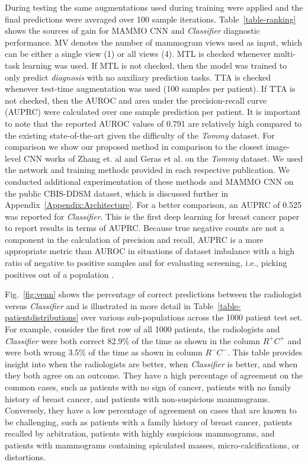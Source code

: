 \documentclass[journal]{IEEEtran}
\begin{document}
During testing the same augmentations used during training were applied and the final predictions were averaged over 100 sample iterations.  Table~\ref{table-ranking} shows the sources of gain for MAMMO CNN and \textit{Classifier} diagnostic performance.  MV denotes the number of mammogram views used as input, which can be either a single view (1) or all views (4).  MTL is checked whenever multi-task learning was used.  If MTL is not checked, then the model was trained to only predict \textit{diagnosis} with no auxiliary prediction tasks.  TTA is checked whenever test-time augmentation was used (100 samples per patient). If TTA is not checked, then the AUROC and area under the precision-recall curve (AUPRC) were calculated over one sample prediction per patient. It is important to note that the reported AUROC values of 0.791 are relatively high compared to the existing state-of-the-art given the difficulty of the \textit{Tommy} dataset. For comparison we show our proposed method in comparison to the closest image-level CNN works of Zhang et. al \cite{fullimage-zhang} and Geras et al. \cite{krysztof-etal-2017} on the \textit{Tommy} dataset. We used the network and training methods provided in each respective publication.  We conducted additional experimentation of these methods and MAMMO CNN on the public CBIS-DDSM dataset, which is discussed further in Appendix~\ref{Appendix:Architecture}. For a better comparison, an AUPRC of 0.525 was reported for  \textit{Classifier}.  This is the first deep learning for breast cancer paper to report results in terms of AUPRC.  Because true negative counts are not a component in the calculation of precision and recall, AUPRC is a more appropriate metric than AUROC in situations of dataset imbalance with a high ratio of negative to positive samples and for evaluating screening, i.e., picking positives out of a population \cite{AUPRC-2015, AUPRC-2006}.
 
Fig.~\ref{fig:venn} shows the percentage of correct predictions between the radiologist versus \textit{Classifier} and is illustrated in more detail in Table~\ref{table-patientdistributions} over various sub-populations across the 1000 patient test set.  For example, consider the first row of all 1000 patients, the radiologists and \textit{Classifier} were both correct 82.9\% of the time as shown in the column $R^+C^+$ and were both wrong 3.5\% of the time as shown in column $R^-C^-$.
This table provides insight into when the radiologists are better, when \textit{Classifier} is better, and when they both agree on an outcome.  They have a high percentage of agreement on the common cases, such as patients with no sign of cancer, patients with no family history of breast cancer, and patients with non-suspicious mammograms.  Conversely, they have a low percentage of agreement on cases that are known to be challenging, such as patients with a family history of breast cancer, patients recalled by arbitration, patients with highly suspicious mammograms, and patients with mammograms containing spiculated masses, micro-calcifications, or distortions.
\end{document}
